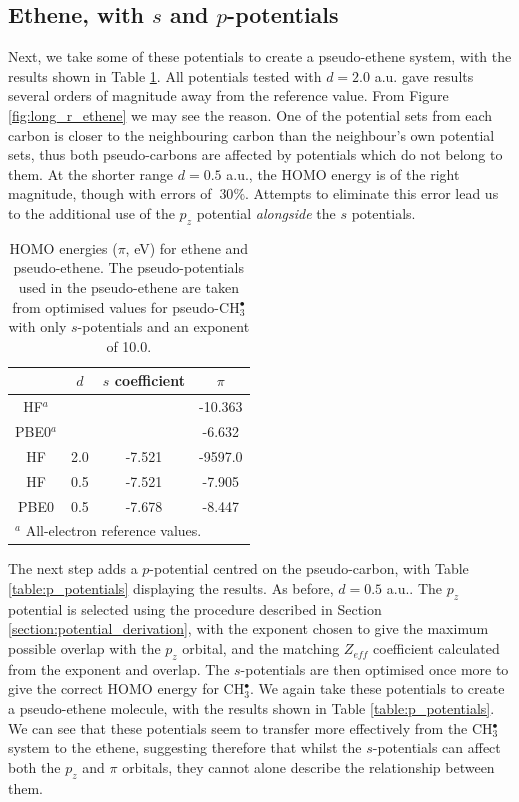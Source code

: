 \documentclass[journal=jctcce,manuscript=article]{achemso}
\begin{document}
\subsection{Ethene, with \(s\) and \(p\)-potentials}

Next, we take some of these potentials to create a pseudo-ethene system, with the results shown in Table \ref{table:ethene_s_pseudo}. All potentials tested with \(d = 2.0\) a.u. gave results several orders of magnitude away from the reference value. From Figure \ref{fig:long_r_ethene} we may see the reason. One of the potential sets from each carbon is closer to the neighbouring carbon than the neighbour's own potential sets, thus both pseudo-carbons are affected by potentials which do not belong to them. At the shorter range \(d = 0.5\) a.u., the HOMO energy is of the right magnitude, though with errors of \(~ 30\%\). Attempts to eliminate this error lead us to the additional use of the \(p_{z}\) potential \textit{alongside} the \(s\) potentials.

\begin{table}[ht]
\caption{HOMO energies ($\pi$, eV) for ethene and pseudo-ethene. The pseudo-potentials used in the pseudo-ethene are taken from optimised values for 
pseudo-CH\(^{\bullet}_{3}\) with only \(s\)-potentials and an exponent of 10.0.}
\begin{tabular}{c c c c}
\hline
& $d$ & \(s\) coefficient & \( \pi \)  \\
\hline
HF$^a$   &     &        & -10.363 \\
PBE0$^a$ &     &        & -6.632 \\
HF       & 2.0 & -7.521 & -9597.0 \\
HF       & 0.5 & -7.521  & -7.905 \\
PBE0     & 0.5 &-7.678  & -8.447 \\
\hline
\multicolumn{4}{l}{$^a$ All-electron reference values.}\\
\end{tabular}
\label{table:ethene_s_pseudo}
\end{table}

The next step adds a \(p\)-potential centred on the pseudo-carbon, with Table \ref{table:p_potentials} displaying the results. As before, \(d = 0.5\) a.u.. The \(p_{z}\) potential is selected using the procedure described in Section \ref{section:potential_derivation}, with the exponent chosen to give the maximum possible overlap with the \(p_{z}\) orbital, and the matching \(Z_{eff}\) coefficient calculated from the exponent and overlap. The \(s\)-potentials are then optimised once more to give the correct HOMO energy for CH\(^{\bullet}_{3}\). We again take these potentials to create a pseudo-ethene molecule, with the results shown in Table \ref{table:p_potentials}. We can see that these potentials seem to transfer more effectively from the CH\(^{\bullet}_{3}\) system to the ethene, suggesting therefore that whilst the \(s\)-potentials can affect both the \(p_{z}\) and \(\pi\) orbitals, they 
cannot alone describe the relationship between them.
\end{document}
